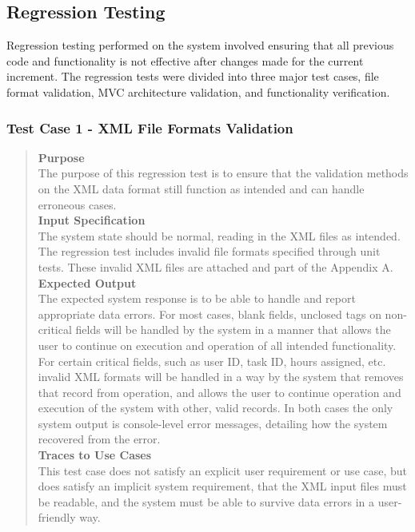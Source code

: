 \documentclass[12pt]{article}
\begin{document}
\subsection{Regression Testing}
{
Regression testing performed on the system involved ensuring that all previous code and functionality is not effective after changes made for the current increment. The regression tests were divided into three major test cases, file format validation, MVC architecture validation, and functionality verification.
}
\subsubsection{Test Case 1 - XML File Formats Validation}
\begin{quote}
{\bf Purpose}
\\
{
The purpose of this regression test is to ensure that the validation methods on the XML data format still function as intended and can handle erroneous cases.
}
\\
{\bf Input Specification}
\\
{
The system state should be normal, reading in the XML files as intended. The regression test includes invalid file formats specified through unit tests. These invalid XML files are attached and part of the Appendix A.
}
\\
{\bf Expected Output}
\\
{
The expected system response is to be able to handle and report appropriate data errors. For most cases, blank fields, unclosed tags on non-critical fields will be handled by the system in a manner that allows the user to continue on execution and operation of all intended functionality. For certain critical fields, such as user ID, task ID, hours assigned, etc. invalid XML formats will be handled in a way by the system that removes that record from operation, and allows the user to continue operation and execution of the system with other, valid records. In both cases the only system output is console-level error messages, detailing how the system recovered from the error.
}
\\
{\bf Traces to Use Cases}
\\
{
This test case does not satisfy an explicit user requirement or use case, but does satisfy an implicit system requirement, that the XML input files must be readable, and the system must be able to survive data errors in a user-friendly way.
}
\end{quote}
\end{document}
